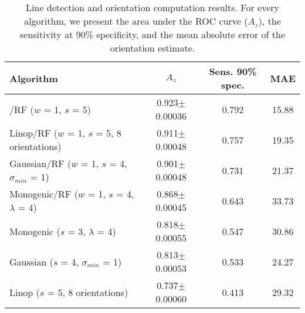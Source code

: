 \begin{table}
\centering
\caption{Line detection and orientation computation results. For every algorithm, we present the area under the ROC curve ($A_z$), the sensitivity at 90\% specificity, and the mean absolute error of the orientation estimate.}
\label{t:line_detection}
%
\begin{tabular}{l c c c}
Algorithm	
		& $A_z$							& Sens. \@ 90\% spec. & MAE \\
\hline
\dtcwt{}/RF ($w$ = 1, $s$ = 5)												
		& 0.923$\pm$0.00036	& 0.792 							& 15.88 \\
Linop/RF ($w$ = 1, $s$ = 5, 8 orientations)				
		& 0.911$\pm$0.00048	& 0.757								& 19.35 \\
Gaussian/RF ($w$ = 1, $s$ = 4, $\sigma_{min}$ = 1)
		& 0.901$\pm$0.00048	& 0.731								& 21.37 \\
Monogenic/RF ($w$ = 1, $s$ = 4, $\lambda$ = 4)
		& 0.868$\pm$0.00045	& 0.643								& 33.73 \\
Monogenic ($s$ = 3, $\lambda$ = 4)									
		& 0.818$\pm$0.00055	& 0.547								& 30.86 \\
Gaussian ($s$ = 4, $\sigma_{min}$ = 1)							
		& 0.813$\pm$0.00053	& 0.533								& 24.27 \\
Linop ($s$ = 5, 8 orientations)										
		& 0.737$\pm$0.00060	& 0.413								& 29.32 \\
\end{tabular}
\end{table}